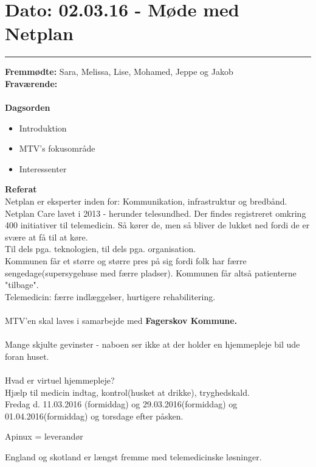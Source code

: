 

\section{Dato: 02.03.16    -    Møde med Netplan}
\hrule

\textbf{Fremmødte:} Sara, Melissa, Lise, Mohamed, Jeppe og Jakob\\

\textbf{Fraværende:} 
\\
\\
\textbf{Dagsorden}
\begin{itemize}
	\item Introduktion
	\item MTV's fokusområde
	\item Interessenter
\end{itemize}

\textbf{Referat} 
\\
Netplan er eksperter inden for:
Kommunikation, infrastruktur og bredbånd. \\
Netplan Care lavet i 2013 - herunder telesundhed.
Der findes registreret omkring 400 initiativer til telemedicin. Så kører de, men så bliver de lukket ned fordi de er svære at få til at køre. \\
Til dels pga. teknologien, til dels pga. organisation. \\
Kommunen får et større og større pres på sig fordi folk har færre sengedage(supersygehuse med færre pladser). Kommunen får altså patienterne "tilbage". \\
Telemedicin: færre indlæggelser, hurtigere rehabilitering.\\\\
MTV'en skal laves i samarbejde med \textbf{Fagerskov Kommune.}
\\\\
Mange skjulte gevinster - naboen ser ikke at der holder en hjemmepleje bil ude foran huset.\\\\
Hvad er virtuel hjemmepleje? \\
Hjælp til medicin indtag, kontrol(husket at drikke), tryghedskald.\\

Fredag d. 11.03.2016 (formiddag) og 29.03.2016(formiddag) og 01.04.2016(formiddag) og torsdage efter påsken.

Apinux = leverandør

England og skotland er længst fremme med telemedicinske løsninger. 

